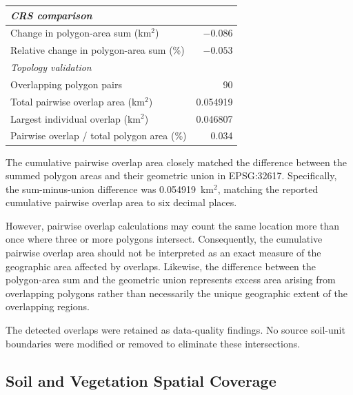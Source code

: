 \begin{table}[htbp]
\begin{tabular}{lr}
		\hline
		\multicolumn{2}{l}{
			\textit{CRS comparison}
		} \\
		\hline
		
		Change in polygon-area sum (km$^2$)
		& $-0.086$ \\
		
		Relative change in polygon-area sum (\%)
		& $-0.053$ \\
		
		\hline
		\multicolumn{2}{l}{
			\textit{Topology validation}
		} \\
		\hline
		
		Overlapping polygon pairs
		& 90 \\
		
		Total pairwise overlap area (km$^2$)
		& 0.054919 \\
		
		Largest individual overlap (km$^2$)
		& 0.046807 \\
		
		Pairwise overlap / total polygon area (\%)
		& 0.034 \\
		
		\hline
	\end{tabular}
\end{table}

The cumulative pairwise overlap area closely
matched the difference between the summed
polygon areas and their geometric union in
EPSG:32617. Specifically, the sum-minus-union
difference was 0.054919~km$^2$, matching the
reported cumulative pairwise overlap area
to six decimal places.

However, pairwise overlap calculations may
count the same location more than once where
three or more polygons intersect. Consequently,
the cumulative pairwise overlap area should
not be interpreted as an exact measure of
the geographic area affected by overlaps.
Likewise, the difference between the polygon-area
sum and the geometric union represents excess
area arising from overlapping polygons rather
than necessarily the unique geographic extent
of the overlapping regions.

The detected overlaps were retained as
data-quality findings. No source soil-unit
boundaries were modified or removed to
eliminate these intersections.

\subsection{Soil and Vegetation Spatial Coverage}
\label{subsec:spatial_results}

